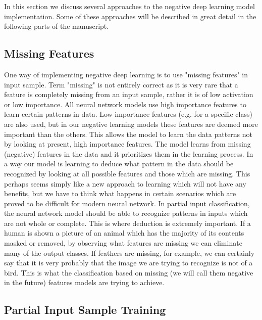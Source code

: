 \documentclass[b5paper]{book}
\begin{document}
In this section we discuss several approaches to the negative deep learning model implementation. Some of these approaches will be described in great detail in the following parts of the manuscript.

\subsection{Missing Features}

One way of implementing negative deep learning is to use "missing features" in input sample. Term "missing" is not entirely correct as it is very rare that a feature is completely missing from an input sample, rather it is of low activation or low importance. All neural network models use high importance features to learn certain patterns in data. Low importance features (e.g. for a specific class) are also used, but in our negative learning models these features are deemed more important than the others. This allows the model to learn the data patterns not by looking at present, high importance features. The model learns from missing (negative) features in the data and it prioritizes them in the learning process. In a way our model is learning to deduce what pattern in the data should be recognized by looking at all possible features and those which are missing. This perhaps seems simply like a new approach to learning which will not have any benefits, but we have to think what happens in certain scenarios which are proved to be difficult for modern neural network. In partial input classification, the neural network model should be able to recognize patterns in inputs which are not whole or complete. This is where deduction is extremely important. If a human is shown a picture of an animal which has the majority of its contents masked or removed, by observing what features are missing we can eliminate many of the output classes. If feathers are missing, for example, we can certainly say that it is very probably that the image we are trying to recognize is not of a bird. This is what the classification based on missing (we will call them negative in the future) features models are trying to achieve.

\subsection{Partial Input Sample Training}
\end{document}
